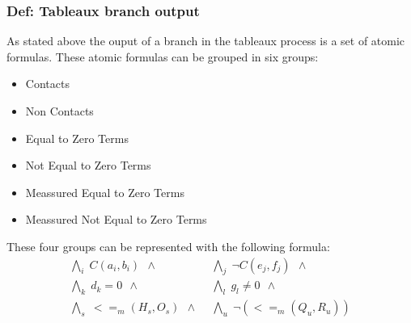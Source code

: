 \documentclass{article}
\begin{document}
			\subsubsection{Def: Tableaux branch output}
			\label{tableaux:branch:output}
				As stated above the ouput of a branch in the tableaux process is a set of atomic formulas.
				These atomic formulas can be grouped in six groups:
				\begin{itemize}
					\item Contacts
					\item Non Contacts
					\item Equal to Zero Terms
					\item Not Equal to Zero Terms
					\item Meassured Equal to Zero Terms
					\item Meassured Not Equal to Zero Terms
				\end{itemize}
				These four groups can be represented with the following formula:
				\begin{align*}
					\bigwedge\nolimits_{i} \; C(a_i, b_i) \:\: \wedge \:\: &
					\bigwedge\nolimits_{j} \; \neg C(e_j, f_j) \:\: \wedge \:\: \\
					\bigwedge\nolimits_{k} \; d_k = 0 \:\: \wedge \:\: &
					\bigwedge\nolimits_{l} \; g_l \neq 0 \:\: \wedge \:\: \\
					\bigwedge\nolimits_{s} \; <=_m(H_s, O_s) \:\: \wedge \:\: &
					\bigwedge\nolimits_{u} \; \neg (<=_m(Q_u, R_u) )
				\end{align*}
\end{document}
